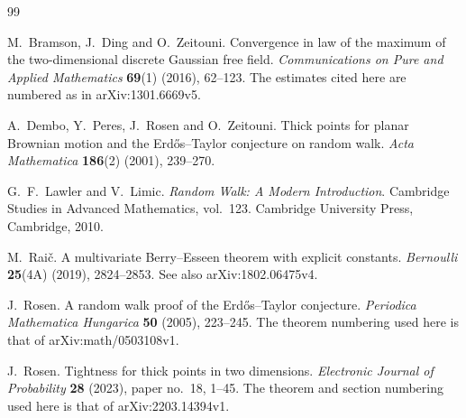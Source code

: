 \documentclass[11pt,a4paper]{article}
\numberwithin{equation}{section}
\theoremstyle{remark}
\begin{document}
\clearpage
{}
{}
\begin{thebibliography}{99}
\raggedright

M.~Bramson, J.~Ding and O.~Zeitouni.
Convergence in law of the maximum of the two-dimensional discrete Gaussian free field.
\emph{Communications on Pure and Applied Mathematics} \textbf{69}(1) (2016), 62--123.
The estimates cited here are numbered as in arXiv:1301.6669v5.

A.~Dembo, Y.~Peres, J.~Rosen and O.~Zeitouni.
Thick points for planar Brownian motion and the Erd\H{o}s--Taylor conjecture on random walk.
\emph{Acta Mathematica} \textbf{186}(2) (2001), 239--270.

G.~F.~Lawler and V.~Limic.
\emph{Random Walk: A Modern Introduction}.
Cambridge Studies in Advanced Mathematics, vol.~123.
Cambridge University Press, Cambridge, 2010.

M.~Rai\v{c}.
A multivariate Berry--Esseen theorem with explicit constants.
\emph{Bernoulli} \textbf{25}(4A) (2019), 2824--2853.
See also arXiv:1802.06475v4.

J.~Rosen.
A random walk proof of the Erd\H{o}s--Taylor conjecture.
\emph{Periodica Mathematica Hungarica} \textbf{50} (2005), 223--245.
The theorem numbering used here is that of arXiv:math/0503108v1.

J.~Rosen.
Tightness for thick points in two dimensions.
\emph{Electronic Journal of Probability} \textbf{28} (2023), paper no.~18, 1--45.
The theorem and section numbering used here is that of arXiv:2203.14394v1.

\end{thebibliography}
\end{document}
